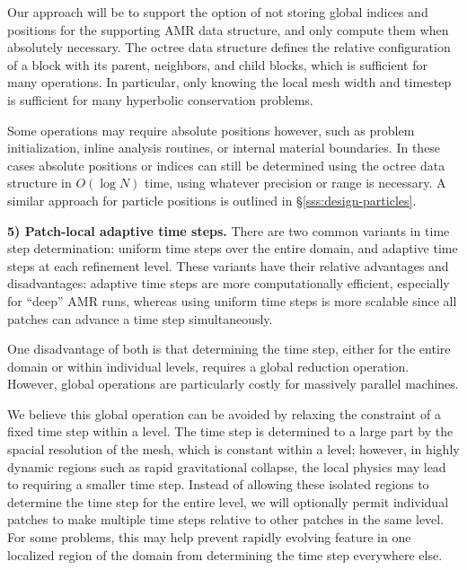 \documentclass[10pt,twocolumn]{article}
\begin{document}
Our approach will be to support the option of not storing global
indices and positions for the supporting AMR data structure, and only
compute them when absolutely necessary.  The octree data structure
defines the relative configuration of a block with its parent,
neighbors, and child blocks, which is sufficient for many operations.
In particular, only knowing the local mesh width and timestep is
sufficient for many hyperbolic conservation problems.

Some operations may require absolute positions however, such as
problem initialization, inline analysis routines, or internal material
boundaries.  In these cases absolute positions or indices can still be
determined using the octree data structure in $O(\log N)$ time, using
whatever precision or range is necessary.  A similar approach for
particle positions is outlined in \S\ref{sss:design-particles}.



\textbf{5) Patch-local adaptive time steps.} There are two common
variants in time step determination: uniform time steps over the
entire domain, and adaptive time steps at each refinement level.
These variants have their relative advantages and disadvantages:
adaptive time steps are more computationally efficient, especially for
``deep'' AMR runs, whereas using uniform time steps is more scalable
since all patches can advance a time step simultaneously.

One disadvantage of both is that determining the time step, either for
the entire domain or within individual levels, requires a global
reduction operation.  However, global operations are particularly costly for
massively parallel machines.  

We believe this global operation can be avoided by relaxing the
constraint of a fixed time step within a level.  The time step is
determined to a large part by the spacial resolution of the mesh,
which is constant within a level; however, in highly dynamic regions
such as rapid gravitational collapse, the local physics may lead to
requiring a smaller time step.  Instead of allowing these isolated
regions to determine the time step for the entire level, we will
optionally permit individual patches to make multiple time steps
relative to other patches in the same level.  For some problems, this
may help prevent rapidly evolving feature in one localized region of
the domain from determining the time step everywhere else.
\end{document}
